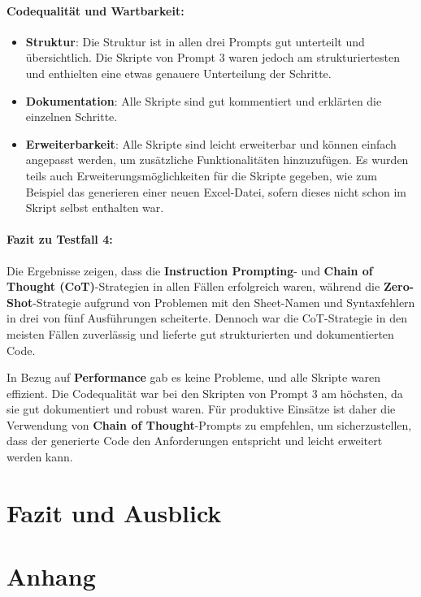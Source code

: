 \documentclass[11pt,a4paper]{article}
\begin{document}
\paragraph{Codequalität und Wartbarkeit:}
\begin{itemize}
    \item \textbf{Struktur}: Die Struktur ist in allen drei Prompts gut unterteilt und übersichtlich. Die Skripte von Prompt 3 waren jedoch am strukturiertesten und enthielten eine etwas genauere Unterteilung der Schritte.
    \item \textbf{Dokumentation}: Alle Skripte sind gut kommentiert und erklärten die einzelnen Schritte.
    \item \textbf{Erweiterbarkeit}: Alle Skripte sind leicht erweiterbar und können einfach angepasst werden, um zusätzliche Funktionalitäten hinzuzufügen. Es wurden teils auch Erweiterungsmöglichkeiten für die Skripte gegeben, wie zum Beispiel das generieren einer neuen Excel-Datei, sofern dieses nicht schon im Skript selbst enthalten war. 
\end{itemize}

\paragraph{Fazit zu Testfall 4:}
Die Ergebnisse zeigen, dass die \textbf{Instruction Prompting}- und \textbf{Chain of Thought (CoT)}-Strategien in allen Fällen erfolgreich waren, während die \textbf{Zero-Shot}-Strategie aufgrund von Problemen mit den Sheet-Namen und Syntaxfehlern in drei von fünf Ausführungen scheiterte. Dennoch war die CoT-Strategie in den meisten Fällen zuverlässig und lieferte gut strukturierten und dokumentierten Code. 

In Bezug auf \textbf{Performance} gab es keine Probleme, und alle Skripte waren effizient. Die Codequalität war bei den Skripten von Prompt 3 am höchsten, da sie gut dokumentiert und robust waren. Für produktive Einsätze ist daher die Verwendung von \textbf{Chain of Thought}-Prompts zu empfehlen, um sicherzustellen, dass der generierte Code den Anforderungen entspricht und leicht erweitert werden kann.

\section{Fazit und Ausblick}
\label{sec:fazit}

\newpage
\section{Anhang}
\label{sec:anhang}
\end{document}
